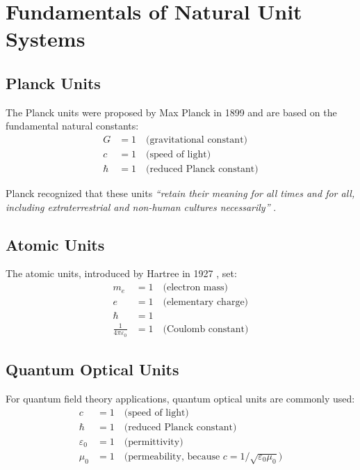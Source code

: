 	\section{Fundamentals of Natural Unit Systems}
	
	\subsection{Planck Units}
	
	The Planck units were proposed by Max Planck in 1899 \cite{planck1900,planck1906} and are based on the fundamental natural constants:
	\begin{align}
		G &= 1 \quad \text{(gravitational constant)} \\
		c &= 1 \quad \text{(speed of light)} \\
		\hbar &= 1 \quad \text{(reduced Planck constant)}
	\end{align}
	
	Planck recognized that these units \textit{``retain their meaning for all times and for all, including extraterrestrial and non-human cultures necessarily''} \cite{planck1900}.
	
	\subsection{Atomic Units}
	
	The atomic units, introduced by Hartree in 1927 \cite{hartree1957}, set:
	\begin{align}
		m_e &= 1 \quad \text{(electron mass)} \\
		e &= 1 \quad \text{(elementary charge)} \\
		\hbar &= 1 \\
		\frac{1}{4\pi\varepsilon_0} &= 1 \quad \text{(Coulomb constant)}
	\end{align}
	
	\subsection{Quantum Optical Units}
	
	For quantum field theory applications, quantum optical units are commonly used:
	\begin{align}
		c &= 1 \quad \text{(speed of light)} \\
		\hbar &= 1 \quad \text{(reduced Planck constant)} \\
		\varepsilon_0 &= 1 \quad \text{(permittivity)} \\
		\mu_0 &= 1 \quad \text{(permeability, because } c = 1/\sqrt{\varepsilon_0 \mu_0}\text{)}
	\end{align}
	
